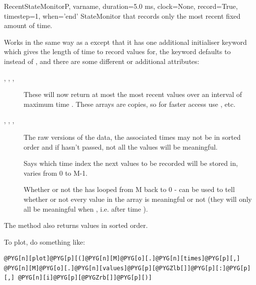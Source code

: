 \documentclass[letterpaper,10pt,english]{manual}
\begin{document}
\hypertarget{brian.RecentStateMonitor}{}\begin{classdesc}{RecentStateMonitor}{P, varname, duration=5.0 ms, clock=None, record=True, timestep=1, when='end'}
StateMonitor that records only the most recent fixed amount of time.

Works in the same way as a \hyperlink{brian.StateMonitor}{} except that it has one
additional initialiser keyword  which gives the length of
time to record values for, the  keyword defaults to 
instead of , and there are some different or additional
attributes:
\begin{description}
\item[, , , ] \leavevmode
These will now return at most the most recent values over an
interval of maximum time . These arrays are copies,
so for faster access use , etc.

\item[, , , ] \leavevmode
The raw versions of the data, the associated times may not be
in sorted order and if  hasn't passed, not all the
values will be meaningful.

\item[] \leavevmode
Says which time index the next values to be recorded will be stored
in, varies from 0 to M-1.

\item[] \leavevmode
Whether or not the  has looped from M back to
0 - can be used to tell whether or not every value in the
 array is meaningful or not (they will only all
be meaningful when , i.e. after time ).

\end{description}

The  method also returns values in sorted order.

To plot, do something like:

\begin{Verbatim}[commandchars=@\[\]]
@PYG[n][plot]@PYG[p][(]@PYG[n][M]@PYG[o][.]@PYG[n][times]@PYG[p][,] @PYG[n][M]@PYG[o][.]@PYG[n][values]@PYG[p][@PYGZlb[]]@PYG[p][:]@PYG[p][,] @PYG[n][i]@PYG[p][@PYGZrb[]]@PYG[p][)]
\end{Verbatim}
\end{classdesc}
\end{document}
